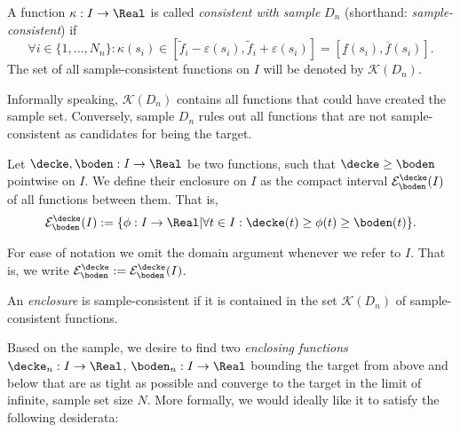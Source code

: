 
\begin{defn}
A function $\kappa: I \to \Real$ is called \textit{consistent with sample} $D_n$ (shorthand: \emph{sample-consistent}) if \[ \forall i \in \{1,\ldots,N_n\}: \kappa(s_i) \in [\tilde f_i - \varepsilon(s_i), \tilde f_i + \varepsilon(s_i)  ] =[\underline f(s_i),\overline f(s_i) ].\] The set of all sample-consistent functions on $I$ will be denoted by $\mathcal K(D_n)$.
\end{defn}
Informally speaking, $\mathcal K(D_n)$ contains all functions that could have created the sample set. Conversely, sample $D_n$ rules out all functions that are not sample-consistent as candidates for being the target. 






\begin{defn}[Enclosure]
Let $\decke,\boden: I \to \Real$ be two functions, such that $\decke
\geq \boden$ pointwise on $I$. We define their enclosure on $I$ as
the compact interval $\mathcal E^\decke_\boden (I)$ of all functions
between them. That is, \[\mathcal E^\decke_\boden (I) := \{\phi: I
\to \Real \vert \forall t \in I: \decke(t) \geq \phi(t) \geq
\boden(t) \}.\]
\end{defn}
For ease of notation we omit the domain argument whenever we refer
to $I$. That is, we write  $\mathcal E^\decke_\boden :=\mathcal
E^\decke_\boden (I)$.


An \emph{enclosure} is sample-consistent if it is contained in the set $\mathcal K(D_n)$ of sample-consistent functions. 

Based on the sample, we desire to find two
\emph{enclosing functions} $\decke_n: I \to \Real$, $\mathfrak
\boden_n: I \to \Real$ bounding the target from above and below that
are as tight as possible and converge to the target in the limit of
infinite, sample set size $N$. 
More formally, we would ideally like it to satisfy the following desiderata:

